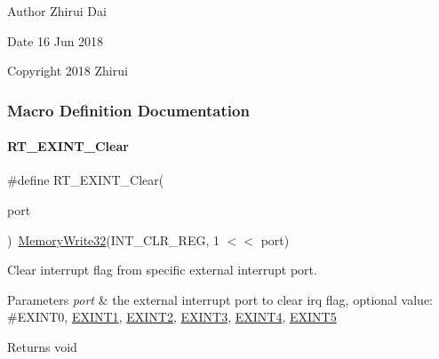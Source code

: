 \begin{DoxyAuthor}{Author}
Zhirui Dai 
\end{DoxyAuthor}
\begin{DoxyDate}{Date}
16 Jun 2018 
\end{DoxyDate}
\begin{DoxyCopyright}{Copyright}
2018 Zhirui 
\end{DoxyCopyright}


\subsubsection{Macro Definition Documentation}
\mbox{\label{a00011_a1bebef46f3eb19ed0c71deb174a4bbaf}} 
\paragraph{\texorpdfstring{R\+T\+\_\+\+E\+X\+I\+N\+T\+\_\+\+Clear}{RT\_EXINT\_Clear}}
{\footnotesize\ttfamily \#define R\+T\+\_\+\+E\+X\+I\+N\+T\+\_\+\+Clear(\begin{DoxyParamCaption}\item[{}]{port }\end{DoxyParamCaption})~\mbox{\hyperlink{a00020_a6b9732365b12e48ddb89fe1028b975b0}{Memory\+Write32}}(I\+N\+T\+\_\+\+C\+L\+R\+\_\+\+R\+EG, 1 $<$$<$ port)}



Clear interrupt flag from specific external interrupt port. 


\begin{DoxyParams}{Parameters}
{\em port} & the external interrupt port to clear irq flag, optional value\+: \#\+E\+X\+I\+N\+T0, \mbox{\hyperlink{a00011_af11f5754cc92430795a63bb53d964cd4a6c87103fd7c63fc99ee4b631c0a4dac4}{E\+X\+I\+N\+T1}}, \mbox{\hyperlink{a00011_af11f5754cc92430795a63bb53d964cd4a92c5398067978d1aefd4ba3c276dec32}{E\+X\+I\+N\+T2}}, \mbox{\hyperlink{a00011_af11f5754cc92430795a63bb53d964cd4a3c37ddaa34bf4297b421d8577be06895}{E\+X\+I\+N\+T3}}, \mbox{\hyperlink{a00011_af11f5754cc92430795a63bb53d964cd4a766aca243fc0f7aa292c791202bef6e7}{E\+X\+I\+N\+T4}}, \mbox{\hyperlink{a00011_af11f5754cc92430795a63bb53d964cd4af59c814bf9818345f24bb79e7533945c}{E\+X\+I\+N\+T5}} \\
\hline
\end{DoxyParams}
\begin{DoxyReturn}{Returns}
void 
\end{DoxyReturn}
\mbox{\label{a00011_a4f2cc857d9a0da5f06bbf5ff62babbdb}} 
